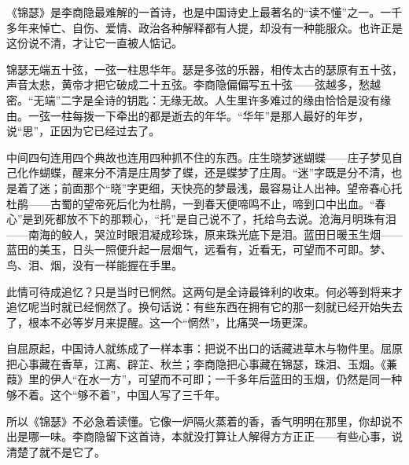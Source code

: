 \begin{appreciation}
《锦瑟》是李商隐最难解的一首诗，也是中国诗史上最著名的“读不懂”之一。一千多年来悼亡、自伤、爱情、政治各种解释都有人提，却没有一种能服众。也许正是这份说不清，才让它一直被人惦记。

锦瑟无端五十弦，一弦一柱思华年。瑟是多弦的乐器，相传太古的瑟原有五十弦，声音太悲，黄帝才把它破成二十五弦。李商隐偏偏写五十弦——弦越多，愁越密。“无端”二字是全诗的钥匙：无缘无故。人生里许多难过的缘由恰恰是没有缘由。一弦一柱每拨一下牵出的都是逝去的年华。“华年”是那人最好的年岁，说“思”，正因为它已经过去了。

中间四句连用四个典故也连用四种抓不住的东西。庄生晓梦迷蝴蝶——庄子梦见自己化作蝴蝶，醒来分不清是庄周梦了蝶，还是蝶梦了庄周。“迷”字既是分不清，也是着了迷；前面那个“晓”字更细，天快亮的梦最浅，最容易让人出神。望帝春心托杜鹃——古蜀的望帝死后化为杜鹃，一到春天便啼鸣不止，啼到口中出血。“春心”是到死都放不下的那颗心，“托”是自己说不了，托给鸟去说。沧海月明珠有泪——南海的鲛人，哭泣时眼泪凝成珍珠，原来珠光底下是泪。蓝田日暖玉生烟——蓝田的美玉，日头一照便升起一层烟气，远看有，近看无，可望而不可即。梦、鸟、泪、烟，没有一样能握在手里。

此情可待成追忆？只是当时已惘然。这两句是全诗最锋利的收束。何必等到将来才追忆呢当时就已经惘然了。换句话说：有些东西在拥有它的那一刻就已经开始失去了，根本不必等岁月来提醒。这一个“惘然”，比痛哭一场更深。

自屈原起，中国诗人就练成了一样本事：把说不出口的话藏进草木与物件里。屈原把心事藏在香草，江离、辟芷、秋兰；李商隐把心事藏在锦瑟，珠泪、玉烟。《蒹葭》里的伊人“在水一方”，可望而不可即；一千多年后蓝田的玉烟，仍然是同一种够不着。这个“够不着”，中国人写了三千年。

所以《锦瑟》不必急着读懂。它像一炉隔火蒸着的香，香气明明在那里，你却说不出是哪一味。李商隐留下这首诗，本就没打算让人解得方方正正——有些心事，说清楚了就不是它了。
\end{appreciation}
